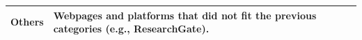 \documentclass{article}
\newcommand{\ShowPercentageNoHundred}[2]{%
    \edef\percentage{\fpeval{round(#1/#2*100,1)}}%
    \ifdim\percentage pt < 10pt
        (\hspace*{4.3pt}\num{\percentage}\%)
    \else
        (\num{\percentage}\%)
    \fi
}
\newcommand*\ChartWithAbsoluteAndPercentageNumbers[2]{
    \numprint{#1}&
    \ShowPercentageNoHundred{#1}{#2}&
    \raisebox{-0.05em}{\inlinechart{#1}{#2}}
}
\newlength\BARSIZE  \setlength\BARSIZE{0.9cm}
\newcommand{\inlinechart}[2]{%
    \edef\blackbar{\fpeval{#1/#2}}%
    \edef\whitebar{\fpeval{1 - (#1/#2)}}%
    \textcolor{black!80}{\rule{\blackbar\BARSIZE}{1.6ex}}%
    \textcolor{black!10}{\rule{\whitebar\BARSIZE}{1.6ex}}%
}
\begin{document}
\begin{table}[htbp]
\begin{threeparttable}
\begin{tabular}{@{}p{18mm} m{85mm} @{\hskip 0.1in} r @{\hskip 0.03in} r @{\hskip 0.02in} l@{}}
\midrule
        Others &
        Webpages and platforms that did not fit the previous categories (e.g., ResearchGate). &
            \ChartWithAbsoluteAndPercentageNumbers{\varOtherRepsICSEFSE}{\varTotalOfLinksICSEFSE}\\
   
        \bottomrule
   
    \end{tabular}
    \end{threeparttable}

\end{table}
\end{document}
